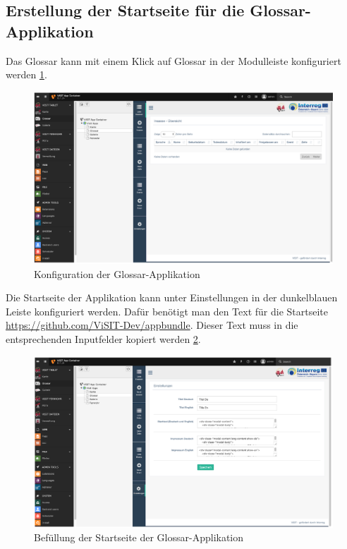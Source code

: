\subsection{Erstellung der Startseite für die Glossar-Applikation}
Das Glossar kann mit einem Klick auf Glossar in der Modulleiste konfiguriert werden \ref{img:konfiguration_glossar}.

\begin{figure}[ht!]
\centering
\includegraphics[width=12cm]{Figures/paula/glossar/konfiguration_glossar.png}
\caption{Konfiguration der Glossar-Applikation}
\label{img:konfiguration_glossar}
\end{figure}

Die Startseite der Applikation kann unter Einstellungen in der dunkelblauen Leiste konfiguriert werden. Dafür benötigt man den Text für die Startseite \url{https://github.com/ViSIT-Dev/appbundle}. Dieser Text muss in die entsprechenden Inputfelder kopiert werden \ref{img:startseite_glossar}.

\begin{figure}[ht!]
\centering
\includegraphics[width=12cm]{Figures/paula/glossar/startseite_glossar.png}
\caption{Befüllung der Startseite der Glossar-Applikation}
\label{img:startseite_glossar}
\end{figure}

